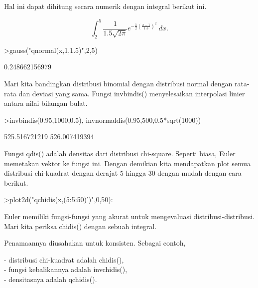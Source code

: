 \documentclass[a4paper,10pt]{article}
\begin{document}
\begin{eulernotebook}
\begin{eulercomment}
\begin{eulercomment}
\begin{eulercomment}
\begin{eulercomment}
\begin{eulercomment}
\begin{eulercomment}
\begin{eulercomment}
\begin{eulercomment}
\begin{eulercomment}
\begin{eulercomment}
\begin{eulercomment}
\begin{eulercomment}
\begin{eulercomment}
\begin{eulercomment}
\begin{eulercomment}
\begin{eulercomment}
\begin{eulercomment}
\begin{eulercomment}
\begin{eulercomment}
Hal ini dapat dihitung secara numerik dengan integral berikut ini.\\
\end{eulercomment}
\begin{eulerformula}
\[
\int_2^5 \frac{1}{1.5\sqrt{2\pi}}e^{-\frac{1}{2}(\frac{x-1}{1.5})^2}\ dx.
\]
\end{eulerformula}
\begin{eulerprompt}
>gauss("qnormal(x,1,1.5)",2,5)
\end{eulerprompt}
\begin{euleroutput}
  0.248662156979
\end{euleroutput}
\begin{eulercomment}
Mari kita bandingkan distribusi binomial dengan distribusi normal
dengan rata-rata dan deviasi yang sama. Fungsi invbindis()
menyelesaikan interpolasi linier antara nilai bilangan bulat.
\end{eulercomment}
\begin{eulerprompt}
>invbindis(0.95,1000,0.5), invnormaldis(0.95,500,0.5*sqrt(1000))
\end{eulerprompt}
\begin{euleroutput}
  525.516721219
  526.007419394
\end{euleroutput}
\begin{eulercomment}
Fungsi qdis() adalah densitas dari distribusi chi-square. Seperti
biasa, Euler memetakan vektor ke fungsi ini. Dengan demikian kita
mendapatkan plot semua distribusi chi-kuadrat dengan derajat 5 hingga
30 dengan mudah dengan cara berikut.
\end{eulercomment}
\begin{eulerprompt}
>plot2d("qchidis(x,(5:5:50)')",0,50):
\end{eulerprompt}
\begin{eulercomment}
Euler memiliki fungsi-fungsi yang akurat untuk mengevaluasi
distribusi-distribusi. Mari kita periksa chidis() dengan sebuah
integral.

Penamaannya diusahakan untuk konsisten. Sebagai contoh,

- distribusi chi-kuadrat adalah chidis(),\\
- fungsi kebalikannya adalah invchidis(),\\
- densitasnya adalah qchidis().


\end{eulercomment}
\end{eulercomment}
\end{eulercomment}
\end{eulercomment}
\end{eulercomment}
\end{eulercomment}
\end{eulercomment}
\end{eulercomment}
\end{eulercomment}
\end{eulercomment}
\end{eulercomment}
\end{eulercomment}
\end{eulercomment}
\end{eulercomment}
\end{eulercomment}
\end{eulercomment}
\end{eulercomment}
\end{eulercomment}
\end{eulercomment}
\end{eulernotebook}
\end{document}
